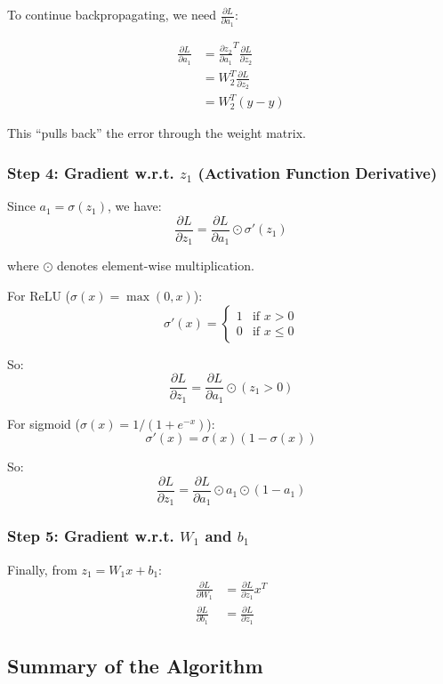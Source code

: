 \documentclass[11pt,oneside]{book}
\begin{document}
To continue backpropagating, we need $\frac{\partial L}{\partial a_1}$:

\begin{align*}
\frac{\partial L}{\partial a_1} &= \frac{\partial z_2}{\partial a_1}^T \frac{\partial L}{\partial z_2} \\
&= W_2^T \frac{\partial L}{\partial z_2} \\
&= W_2^T (\hat{y} - y)
\end{align*}

This ``pulls back'' the error through the weight matrix.

\subsubsection{Step 4: Gradient w.r.t. $z_1$ (Activation Function Derivative)}

Since $a_1 = \sigma(z_1)$, we have:
\[
\frac{\partial L}{\partial z_1} = \frac{\partial L}{\partial a_1} \odot \sigma'(z_1)
\]

where $\odot$ denotes element-wise multiplication.

For ReLU ($\sigma(x) = \max(0, x)$):
\[
\sigma'(x) = \begin{cases}
1 & \text{if } x > 0 \\
0 & \text{if } x \leq 0
\end{cases}
\]

So:
\[
\frac{\partial L}{\partial z_1} = \frac{\partial L}{\partial a_1} \odot (z_1 > 0)
\]

For sigmoid ($\sigma(x) = 1/(1 + e^{-x})$):
\[
\sigma'(x) = \sigma(x)(1 - \sigma(x))
\]

So:
\[
\frac{\partial L}{\partial z_1} = \frac{\partial L}{\partial a_1} \odot a_1 \odot (1 - a_1)
\]

\subsubsection{Step 5: Gradient w.r.t. $W_1$ and $b_1$}

Finally, from $z_1 = W_1 x + b_1$:
\begin{align*}
\frac{\partial L}{\partial W_1} &= \frac{\partial L}{\partial z_1} x^T \\
\frac{\partial L}{\partial b_1} &= \frac{\partial L}{\partial z_1}
\end{align*}

\subsection{Summary of the Algorithm}
\end{document}
